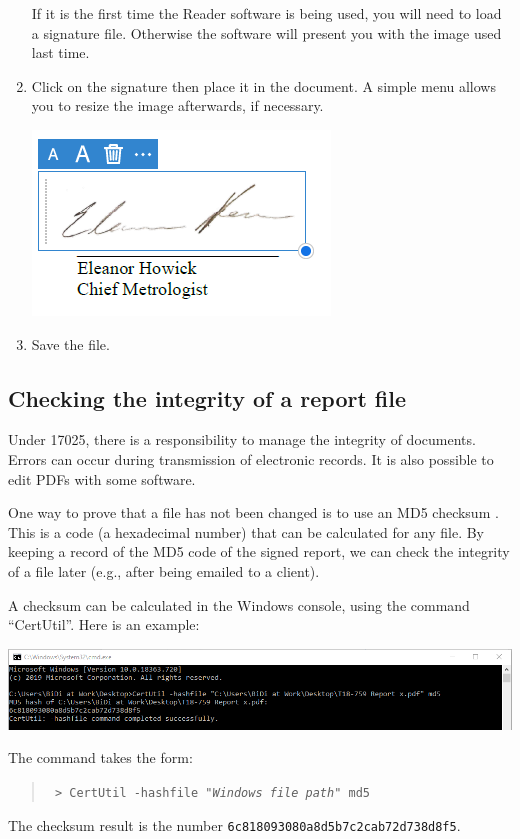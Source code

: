 \begin{enumerate}
If it is the first time the Reader software is being used, you will need to load a signature file. Otherwise the software will present you with the image used last time. 
\item Click on the signature then place it in the document. A simple menu allows you to resize the image afterwards, if necessary. 
\begin{center}
\includegraphics[scale=1]{pictures/acrobat_signing_4}
\end{center}
\item Save the file.
\end{enumerate}

\subsection{Checking the integrity of a report file}
 \label{ss:file_integrity_md5}
 
Under 17025, there is a responsibility to manage the integrity of documents. Errors can occur during transmission of electronic records. It is also possible to edit PDFs with some software.

One way to prove that a file has not been changed is to use an MD5 checksum \cite{MD5}. This is a code (a hexadecimal number) that can be calculated for any file. By keeping a record of the MD5 code of the signed report, we can check the integrity of a file later (e.g., after being emailed to a client). 

A checksum can be calculated in the Windows console, using the command ``CertUtil''. Here is an example:
\begin{center}
\includegraphics[scale=.6]{pictures/md5_cmd}
\end{center}
The command takes the form: 
\begin{quote}
\texttt{
> CertUtil -hashfile "\textit{Windows file path}" md5}
\end{quote}
The checksum result is the number \texttt{6c818093080a8d5b7c2cab72d738d8f5}.
 
